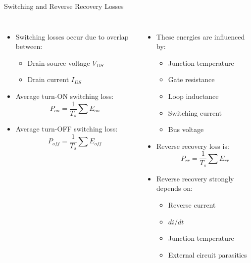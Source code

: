 \begin{frame}{Switching and Reverse Recovery Losses}

\begin{columns}
\begin{itemize}
    \item Switching losses occur due to overlap between:
    \begin{itemize}
        \item Drain-source voltage $V_{DS}$
        \item Drain current $I_{DS}$
    \end{itemize}

    \item Average turn-ON switching loss:
    \[
    P_{on}
    =
    \frac{1}{T_s}
    \sum E_{on}
    \]

    \item Average turn-OFF switching loss:
    \[
    P_{off}
    =
    \frac{1}{T_s}
    \sum E_{off}
    \]
    \end{itemize}
    \begin{itemize}
    \item These energies are influenced by:
    \begin{itemize}
        \item Junction temperature
        \item Gate resistance
        \item Loop inductance
        \item Switching current
        \item Bus voltage
    \end{itemize}

    \item Reverse recovery loss is:
    \[
    P_{rr}
    =
    \frac{1}{T_s}
    \sum E_{rr}
    \]

    \item Reverse recovery strongly depends on:
    \begin{itemize}
        \item Reverse current
        \item $di/dt$
        \item Junction temperature
        \item External circuit parasitics
    \end{itemize}
\end{itemize}
\end{columns}  
\end{frame}



